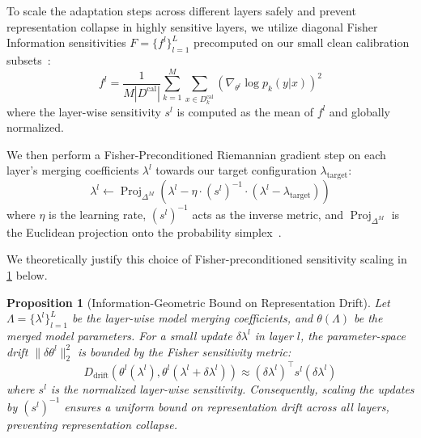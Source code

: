 \documentclass{article}
\theoremstyle{plain}
\newtheorem{proposition}[theorem]{Proposition}
\theoremstyle{definition}
\theoremstyle{remark}
\begin{document}
To scale the adaptation steps across different layers safely and prevent representation collapse in highly sensitive layers, we utilize diagonal Fisher Information sensitivities $F = \{f^l\}_{l=1}^L$ precomputed on our small clean calibration subsets~\cite{dr_fisher, fp_ow}:
\begin{equation}
    f^l = \frac{1}{M |D^{\text{cal}}|} \sum_{k=1}^M \sum_{x \in D_k^{\text{cal}}} \left( \nabla_{\theta^l} \log p_k(y|x) \right)^2
\end{equation}
where the layer-wise sensitivity $s^l$ is computed as the mean of $f^l$ and globally normalized.

We then perform a Fisher-Preconditioned Riemannian gradient step on each layer's merging coefficients $\lambda^l$ towards our target configuration $\lambda_{\text{target}}$:
\begin{equation}
    \lambda^l \leftarrow \operatorname{Proj}_{\Delta^M} \left( \lambda^l - \eta \cdot (s^l)^{-1} \cdot (\lambda^l - \lambda_{\text{target}}) \right)
\end{equation}
where $\eta$ is the learning rate, $(s^l)^{-1}$ acts as the inverse metric, and $\operatorname{Proj}_{\Delta^M}$ is the Euclidean projection onto the probability simplex~\cite{simplex_projection}.

We theoretically justify this choice of Fisher-preconditioned sensitivity scaling in \cref{prop:bound} below.

\begin{proposition}[Information-Geometric Bound on Representation Drift]
\label{prop:bound}
Let $\Lambda = \{\lambda^l\}_{l=1}^L$ be the layer-wise model merging coefficients, and $\theta(\Lambda)$ be the merged model parameters. For a small update $\delta \lambda^l$ in layer $l$, the parameter-space drift $\|\delta \theta^l\|_2^2$ is bounded by the Fisher sensitivity metric:
\begin{equation}
    D_{\mathrm{drift}}(\theta^l(\lambda^l), \theta^l(\lambda^l + \delta \lambda^l)) \approx (\delta \lambda^l)^\top s^l (\delta \lambda^l)
\end{equation}
where $s^l$ is the normalized layer-wise sensitivity. Consequently, scaling the updates by $(s^l)^{-1}$ ensures a uniform bound on representation drift across all layers, preventing representation collapse.
\end{proposition}
\end{document}
